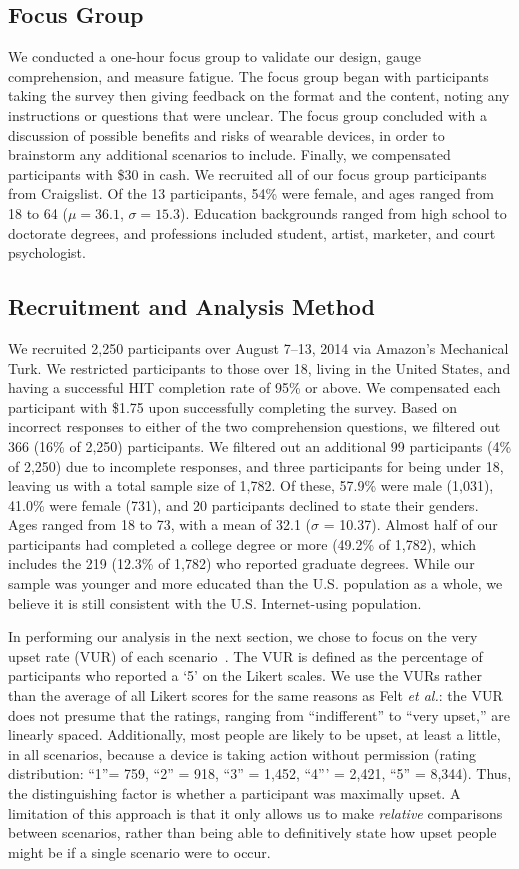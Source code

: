 \documentclass{sig-alternate-hotpets15}
\begin{document}
\subsection{Focus Group}
We conducted a one-hour focus group to validate our design, gauge comprehension, and measure fatigue. The focus group began with participants taking the survey then giving feedback on the format and the content, noting any instructions or questions that were unclear. The focus group concluded with a discussion of possible benefits and risks of wearable devices, in order to brainstorm any additional scenarios to include. Finally, we compensated participants with \$30 in cash. We recruited all of our focus group participants from Craigslist. Of the 13 participants, 54\% were female, and ages ranged from 18 to 64 ($\mu = 36.1$, $\sigma = 15.3$).  Education backgrounds ranged from high school to doctorate degrees, and professions included student, artist, marketer, and court psychologist.

\subsection{Recruitment and Analysis Method}
We recruited 2,250 participants over August 7--13, 2014 via Amazon's Mechanical Turk. We restricted participants to those over 18, living in the United States, and having a successful HIT completion rate of 95\% or above. We compensated each participant with \$1.75 upon successfully completing the survey. Based on incorrect responses to either of the two comprehension questions, we filtered out 366 (16\% of 2,250) participants. We filtered out an additional 99 participants (4\% of 2,250) due to incomplete responses, and three participants for being under 18, leaving us with a total sample size of 1,782. Of these, 57.9\% were male (1,031), 41.0\% were female (731), and 20 participants declined to state their genders. Ages ranged from 18 to 73, with a mean of 32.1 ($\sigma$ = 10.37). Almost half of our participants had completed a college degree or more (49.2\% of 1,782), which includes the 219 (12.3\% of 1,782) who reported graduate degrees. While our sample was younger and more educated than the U.S. population as a whole, we believe it is still consistent with the U.S. Internet-using population.

In performing our analysis in the next section, we chose to focus on the very upset rate (VUR) of each scenario~\cite{Felt}.  The VUR is defined as the percentage of participants who reported a `5' on the Likert scales. 
We use the VURs rather than the average of all Likert scores for the same reasons as Felt {\it et al.}: the VUR does not presume that the ratings, ranging from ``indifferent'' to ``very upset,'' are linearly spaced. Additionally, most people are likely to be upset, at least a little, in all scenarios, because a device is taking action without permission (rating distribution: ``1''= 759, ``2'' = 918, ``3'' = 1,452, ``4''' = 2,421, ``5'' = 8,344). Thus, the distinguishing factor is whether a participant was maximally upset. A limitation of this approach is that it only allows us to make {\it relative} comparisons between scenarios, rather than being able to definitively state how upset people might be if a single scenario were to occur.
\end{document}
